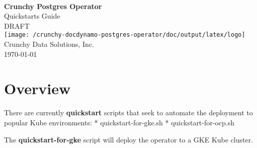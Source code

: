 \documentclass[letterpaper,12pt]{article}
\let\stdsection\section
\renewcommand\section{\newpage\stdsection}
\begin{document}
\hypersetup{pageanchor=false}

\makeatletter
    \begin{titlepage}
        \begin{center}
            {\large \ }\\[18ex]
            {\huge \bfseries Crunchy Postgres Operator}\\[1ex]
            {\large Quickstarts Guide}\\[12ex]
            {\large DRAFT}\\[12ex]
            \texttt{[image: /crunchy-docdynamo-postgres-operator/doc/output/latex/logo]}\\[12ex]
            {\large Crunchy Data Solutions, Inc.}\\[1ex]
            {\large \today}
        \end{center}
    \end{titlepage}
\makeatother
\thispagestyle{empty}
\newpage

\hypersetup{pageanchor=true}

\setcounter{tocdepth}{3}
\thispagestyle{plain}
\renewcommand\contentsname{Table of Contents}
\tableofcontents


\section{Overview}\label{/_overview}

There are currently \textbf{quickstart} scripts that seek to automate the deployment to popular Kube environments: * quickstart-for-gke.sh * quickstart-for-ocp.sh

The \textbf{quickstart-for-gke} script will deploy the operator to a GKE Kube cluster.
\end{document}
